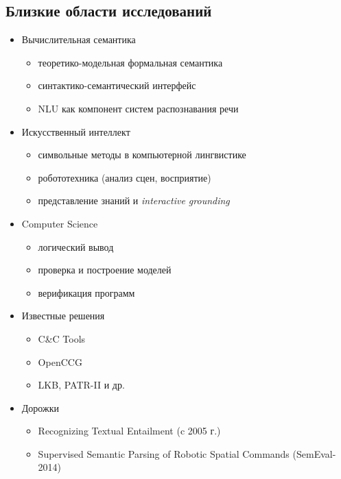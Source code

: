 \documentclass[a4paper,12pt]{article}
\begin{document}
\subsection{Близкие области исследований}
\begin{itemize}
	\item Вычислительная семантика
		\begin{itemize}
			\item теоретико-модельная формальная семантика
			\item синтактико-семантический интерфейс
			\item NLU как компонент систем распознавания речи
		\end{itemize}
	\item Искусственный интеллект
		\begin{itemize}
			\item символьные методы в компьютерной лингвистике
			\item робототехника (анализ сцен, восприятие)
			\item представление знаний и \textit{interactive grounding}
		\end{itemize}
	\item Computer Science
		\begin{itemize}
			\item логический вывод
			\item проверка и построение моделей
			\item верификация программ
		\end{itemize}
	\item Известные решения
		\begin{itemize}
			\item C\&C Tools
			\item OpenCCG
			\item LKB, PATR-II и др.
		\end{itemize}
	\bigskip
	\item Дорожки
		\begin{itemize}
			\item Recognizing Textual Entailment (c 2005 г.)
			\item Supervised Semantic Parsing of Robotic Spatial Commands (SemEval-2014)
		\end{itemize}
\end{itemize}
\end{document}
